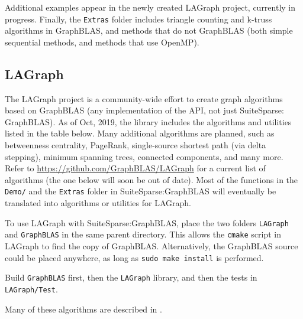 \documentclass[12pt]{article}
\begin{document}
Additional examples appear in the newly created LAGraph project, currently in
progress.  Finally, the \verb'Extras' folder includes triangle counting and
k-truss algorithms in GraphBLAS, and methods that do not GraphBLAS (both simple
sequential methods, and methods that use OpenMP).

\subsection{LAGraph}
\label{lagraph}

The LAGraph project is a community-wide effort to create graph algorithms based
on GraphBLAS (any implementation of the API, not just SuiteSparse: GraphBLAS).
As of Oct, 2019, the library includes the algorithms and utilities listed in
the table below.  Many additional algorithms are planned, such as betweenness
centrality, PageRank, single-source shortest path (via delta stepping), minimum
spanning trees, connected components, and many more.  Refer to
\url{https://github.com/GraphBLAS/LAGraph} for a current list of algorithms
(the one below will soon be out of date).  Most of the functions in the
\verb'Demo/' and the \verb'Extras' folder in SuiteSparse:GraphBLAS will
eventually be translated into algorithms or utilities for LAGraph.

To use LAGraph with SuiteSparse:GraphBLAS, place the two folders \verb'LAGraph'
and \verb'GraphBLAS' in the same parent directory.  This allows the
\verb'cmake' script in LAGraph to find the copy of GraphBLAS.  Alternatively,
the GraphBLAS source could be placed anywhere, as long as
\verb'sudo make install' is performed.

Build \verb'GraphBLAS' first, then the \verb'LAGraph' library, and then the
tests in \verb'LAGraph/Test'.

Many of these algorithms are described in \cite{Davis20}.
\end{document}
